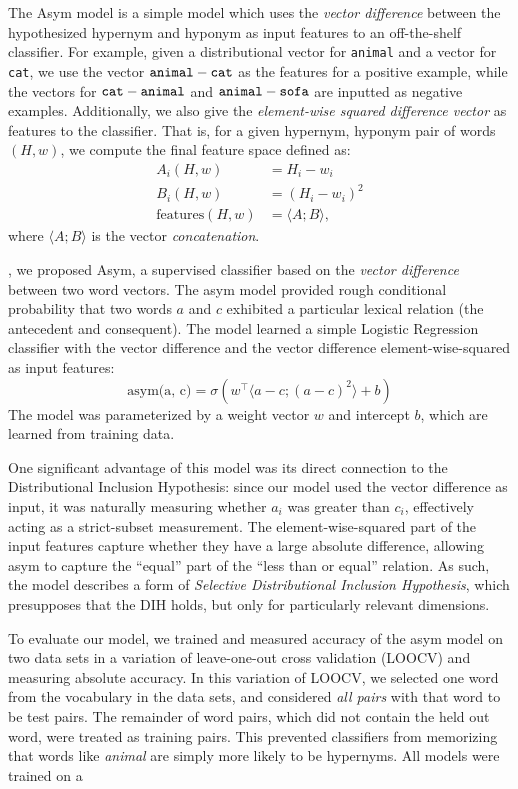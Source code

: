 \documentclass[letterpaper]{article}
\begin{document}
The Asym model is a simple model which uses the {\em vector difference} between
the hypothesized hypernym and hyponym as input features to an off-the-shelf
classifier. For example, given a distributional vector for {\tt animal} and
a vector for {\tt cat}, we use the vector ${\tt animal} - {\tt cat}$ as the
features for a positive example, while the vectors for
${\tt cat} - {\tt animal}$ and ${\tt animal} - {\tt sofa}$ are inputted
as negative examples. Additionally, we also give the {\em element-wise squared
difference vector} as features to the classifier. That is, for a given hypernym, hyponym
pair of words $(H, w)$, we compute the final feature space defined as:
\begin{align*}
  A_i(H, w) & = H_i - w_i\\
  B_i(H, w) & = (H_i - w_i)^2\\
  \text{features}(H, w) & = \langle A; B\rangle,
\end{align*}
where $\langle A; B\rangle$ is the vector {\em concatenation}.

, we proposed Asym, a supervised classifier based on the
{\em vector difference} between two word vectors. The asym model provided
rough conditional probability that two words $a$ and $c$ exhibited a particular
lexical relation (the antecedent and consequent). The model learned a simple
Logistic Regression classifier with the vector difference and the vector
difference element-wise-squared as input features:
\begin{equation*}
  \text{asym({a}, {c})} = \sigma\left({w}^\top \langle{a} - {c}; ({a} - {c})^2\rangle + b\right)
\end{equation*}
The model was parameterized by a weight vector $w$ and intercept $b$, which are
learned from training data.

One significant advantage of this model was its direct connection to the
Distributional Inclusion Hypothesis: since our model used the vector difference
as input, it was naturally measuring whether $a_i$ was greater than $c_i$,
effectively acting as a strict-subset measurement. The element-wise-squared
part of the input features capture whether they have a large absolute difference,
allowing asym to capture the ``equal'' part of the ``less than or equal''
relation. As such, the model describes a form of {\em Selective Distributional
Inclusion Hypothesis}, which presupposes that the DIH holds, but only for
particularly relevant dimensions.

To evaluate our model, we trained and measured accuracy of the asym model on
two data sets in a variation of leave-one-out cross validation (LOOCV) and
measuring absolute accuracy. In this variation of LOOCV, we selected one word
from the vocabulary in the data sets, and considered {\em all pairs} with that
word to be test pairs. The remainder of word pairs, which did not contain the
held out word, were treated as training pairs. This prevented classifiers from
memorizing that words like {\em animal} are simply more likely to be hypernyms.
All models were trained on a 
\end{document}

